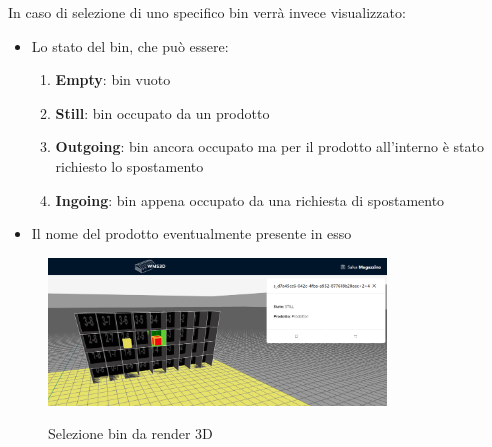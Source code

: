                 In caso di selezione di uno specifico bin verrà invece visualizzato: 
                \begin{itemize}
                    \item Lo stato del bin, che può essere: 
                    \begin{enumerate}
                        \item \textbf{Empty}: bin vuoto
                        \item \textbf{Still}: bin occupato da un prodotto 
                        \item \textbf{Outgoing}: bin ancora occupato ma per il prodotto all'interno è stato richiesto lo spostamento
                        \item \textbf{Ingoing}: bin appena occupato da una richiesta di spostamento
                    \end{enumerate}
                    \item Il nome del prodotto eventualmente presente in esso 
                \end{itemize}
                \begin{figure}[h!]
                    \centering
                    \includegraphics[width=0.8\textwidth]{images/selezione_bin.png}
                    \label{sel_bin}
                    \caption{Selezione bin da render 3D}
                \end{figure}

